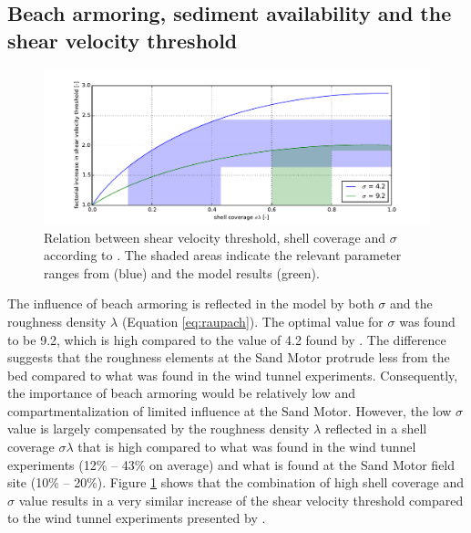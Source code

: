\documentclass[preprint,12pt,authoryear]{elsarticle}
\begin{document}
\subsection{Beach armoring, sediment availability and the shear
  velocity threshold}

\begin{figure}
  \centering
\includegraphics[width=\columnwidth]{sigma}
\caption{Relation between shear velocity threshold, shell coverage and
  $\sigma$ according to \citet[][Equation
  \ref{eq:raupach}]{Raupach1993}. The shaded areas indicate the
  relevant parameter ranges from \citet{McKennaNeuman2012} (blue) and
  the model results (green).}
  \label{fig:sigma}
\end{figure}

The influence of beach armoring is reflected in the model by both
$\sigma$ and the roughness density $\lambda$ (Equation
\ref{eq:raupach}). The optimal value for $\sigma$ was found to be 9.2,
which is high compared to the value of 4.2 found by
\citet{McKennaNeuman2012}. The difference suggests that the roughness
elements at the Sand Motor protrude less from the bed compared to what
was found in the wind tunnel experiments. Consequently, the importance
of beach armoring would be relatively low and compartmentalization of
limited influence at the Sand Motor. However, the low $\sigma$ value
is largely compensated by the roughness density $\lambda$ reflected in
a shell coverage $\sigma \lambda$ that is high compared to what was
found in the wind tunnel experiments (12\% -- 43\% on average) and
what is found at the Sand Motor field site (10\% -- 20\%). Figure
\ref{fig:sigma} shows that the combination of high shell coverage and
$\sigma$ value results in a very similar increase of the shear
velocity threshold compared to the wind tunnel experiments presented
by \citet{McKennaNeuman2012}.
\end{document}
